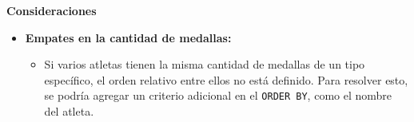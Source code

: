\textbf{Consideraciones}

\begin{itemize}
   \item \textbf{Empates en la cantidad de medallas:}
   \begin{itemize}
       \item Si varios atletas tienen la misma cantidad de medallas de un tipo específico, el orden relativo entre ellos no está definido. Para resolver esto, se podría agregar un criterio adicional en el \texttt{ORDER BY}, como el nombre del atleta.
   \end{itemize}
\end{itemize}

